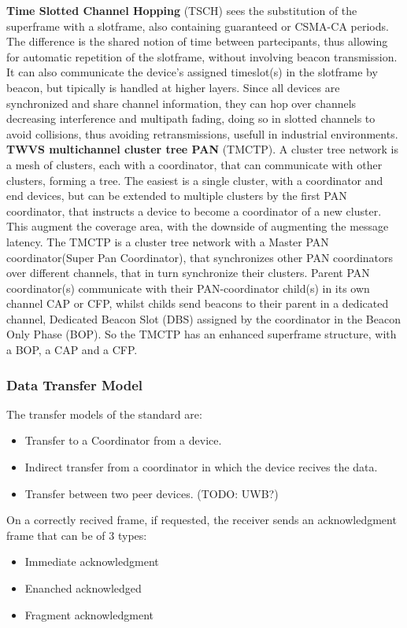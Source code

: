 \documentclass[conference]{IEEEtran}
\begin{document}
\textbf{Time Slotted Channel Hopping} (TSCH) sees the substitution of the superframe with a 
slotframe, also containing guaranteed or CSMA-CA periods. The difference is the shared notion 
of time between partecipants, thus allowing for automatic repetition of the slotframe, without 
involving beacon transmission. It can also communicate the device's assigned timeslot(s) in
the slotframe by beacon, but tipically is handled at higher layers.
Since all devices are synchronized and share channel information, they can hop over channels
decreasing interference and multipath fading, doing so in slotted channels to avoid collisions,
thus avoiding retransmissions, usefull in industrial environments.\\

\textbf{TWVS multichannel cluster tree PAN} (TMCTP).
A cluster tree network is a mesh of clusters, each with a coordinator,
that can communicate with other clusters, forming a tree. The easiest is a single cluster,
with a coordinator and end devices, but can be extended to multiple clusters
by the first PAN coordinator, that instructs a device to become a coordinator 
of a new cluster. This augment the coverage area, with the downside of augmenting the
message latency.
The TMCTP is a cluster tree network with a Master PAN coordinator(Super Pan Coordinator), that
synchronizes other PAN coordinators over different channels, that in turn synchronize
their clusters.
Parent PAN coordinator(s) communicate with their PAN-coordinator child(s) in its own channel 
CAP or CFP, whilst childs send beacons to their parent in a dedicated channel,
Dedicated Beacon Slot (DBS) assigned by the coordinator in the Beacon Only Phase (BOP).
So the TMCTP has an enhanced superframe structure, with a BOP, a CAP and a CFP.\\

\subsubsection{Data Transfer Model}
The transfer models of the standard\cite{10794632} are:
\begin{itemize}
    \item Transfer to a Coordinator from a device.
    \item Indirect transfer from a coordinator in which the device recives the data.
    \item Transfer between two peer devices. (TODO: UWB?)
\end{itemize}

On a correctly recived frame, if requested, the receiver sends an acknowledgment frame that 
can be of 3 types:
\begin{itemize}
    \item Immediate acknowledgment
    \item Enanched acknowledged
    \item Fragment acknowledgment
\end{itemize}
\end{document}
